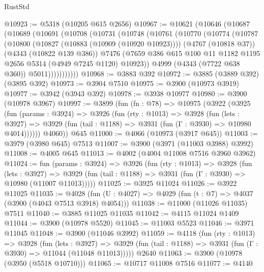 \begin{lexlean}{RustStd}
\begin{coremodule}
@10923 := @5318 (@10205 @615 @2656)
@10967 := @10621
    (@10646
      (@10687
        (@10689
          (@10691
            (@10708
              (@10731
                (@10748
                  (@10761
                    (@10770
                      (@10774
                        (@10787
                          (@10800
                            (@10827 (@10883 (@10909 (@10920 @10923))))
                            (@4767 (@10818 @37))
                            (@4343 (@10822 @139 @386))
                            @7476
                            (@7659
                              @386
                              @615
                              @100
                              @11
                              @1182
                              @1195
                              @2656
                              @5314
                              (@4949 @7245 @1120)
                              @10923))
                          @4999
                          (@4343 (@7722 @638 @360))
                          @5011)))))))))))
@10968 := @3883 @392
@10972 := @3885 (@3889 @392) (@3895 @392)
@10973 := @3904 @7510
@10975 := @3900 (@10973 @3919)
@10977 := @3942 (@3943 @392)
@10978 := @3938 @10977
@10980 := @3900 (@10978 @3967)
@10997 := @3899
    (fun (fn : @78) =>
    @10975
      (@3922
        (@3925
          (fun (params : @3924) =>
          @3926
            (fun (rty : @1013) =>
            @3928
              (fun (lets : @3927) =>
              @3929 (fun (tail : @1188) => @3931 (fun (Γ : @3930) => @10980 @4014))))))
        @4060))
    @645
@11000 := @4066 (@10973 (@3917 @645))
@11003 := @3979 (@3980 @645) @7513
@11007 := @3900 (@3971 (@11003 @3988) @3992)
@11008 := @4005 @645
@11013 := @4002 (@4004 @11008 @7516 @3960 @3962)
@11024 := fun (params : @3924) =>
  @3926
    (fun (rty : @1013) =>
    @3928
      (fun (lets : @3927) =>
      @3929 (fun (tail : @1188) => @3931 (fun (Γ : @3930) => @10980 (@11007 @11013)))))
@11025 := @3925 @11024
@11026 := @3922 @11025
@11035 := @4028 (fun (U : @4027) => @4029 (fun (t : @7) => @4037 (@3900 (@4043 @7513 @3918) @4054)))
@11038 := @11000 (@11026 @11035) @7511
@11040 := @3885 @11025 @11035
@11042 := @4115 @11024 @1409
@11044 := @3900 (@10978 @5520)
@11045 := @11003 @5523
@11046 := @3971 @11045
@11048 := @3900 (@11046 @3992)
@11059 := @4118
    (fun (rty : @1013) =>
    @3928
      (fun (lets : @3927) =>
      @3929 (fun (tail : @1188) => @3931 (fun (Γ : @3930) => @11044 (@11048 @11013)))))
    @2640
@11063 := @3900 (@10978 (@3950 (@5518 @10710)))
@11065 := @10717 @11008 @7516
@11077 := @4140

\end{coremodule}
\end{lexlean}
